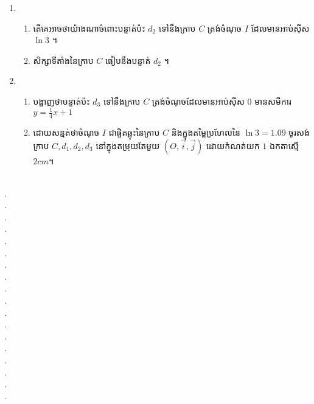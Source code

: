 \documentclass{officialexam}
\begin{document}
\begin{enumerate}[I]
\begin{enumerate}[1]
\begin{enumerate}[k]
			\end{enumerate}
			\item \begin{enumerate}[k]
				\item តើគេអាចថាយ៉ាងណាចំពោះបន្ទាត់ប៉ះ $d_2$ ទៅនឹងក្រាប $C$ ត្រង់ចំណុច $I$ ដែលមានអាប់ស៊ីស $\ln3$ ។
				\item សិក្សាទីតាំងនៃក្រាប $C$ ធៀបនឹងបន្ទាត់ $d_2$ ។
			\end{enumerate}
			\item \begin{enumerate}[k]
				\item បង្ហាញថាបន្ទាត់ប៉ះ $d_3$ ទៅនឹងក្រាប $C$ ត្រង់ចំណុចដែលមានអាប់ស៊ីស $0$ មានសមីការ $y=\frac{1}{4}x+1$
				\item ដោយសន្មត់ថាចំណុច $I$ ជាផ្ចិតឆ្លុះនៃក្រាប $C$ និងក្នុងតម្លៃប្រហែលនៃ $\ln3=1.09$ ចូរសង់ក្រាប $C, d_1, d_2, d_3$ នៅក្នុងតម្រុយតែមួយ $\left(O,\vec{i}, \vec{j}\right)$ ដោយកំណត់យក $1$ ឯកតាស្មើ $2cm$។
			\end{enumerate}
		\end{enumerate}
	\end{enumerate}
	\\
	{\color{white}.}\dotfill\\
	{\color{white}.}\dotfill\\
	{\color{white}.}\dotfill
	\\
	{\color{white}.}\dotfill\\
	{\color{white}.}\dotfill\\
	{\color{white}.}\dotfill
	\\
	{\color{white}.}\dotfill\\
	{\color{white}.}\dotfill\\
	{\color{white}.}\dotfill
	\\
	{\color{white}.}\dotfill\\
	{\color{white}.}\dotfill\\
	{\color{white}.}\dotfill
	\\
	{\color{white}.}\dotfill\\
	{\color{white}.}\dotfill\\
	{\color{white}.}\dotfill
	\\
	{\color{white}.}\dotfill\\
	{\color{white}.}\dotfill\\
	{\color{white}.}\dotfill
	\newpage
	{\maketitle}\\
\end{document}
